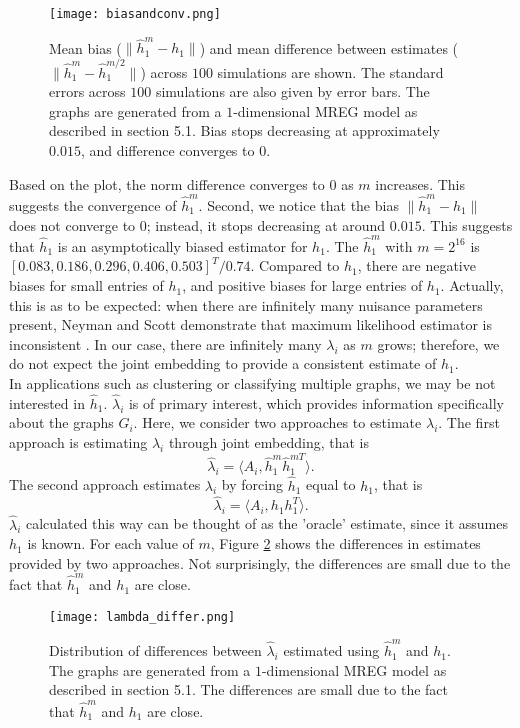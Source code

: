 \documentclass[10pt,journal,compsoc]{IEEEtran}
\begin{document}
\begin{figure}[!htbp]
	\centering
	\texttt{[image: biasandconv.png]}
	\caption{Mean bias ($\|\hat{h}^m_1-h_1\|$) and mean difference between estimates ($\|\hat{h}_1^m-\hat{h}_1^{m/2}\|$) across $100$ simulations are shown. The standard errors across $100$ simulations are also given by error bars. The graphs are generated from a $1$-dimensional MREG model as described in section 5.1. Bias stops decreasing at approximately $0.015$, and difference converges to $0$.}
	\label{fig:db}
\end{figure}

\noindent Based on the plot, the norm difference converges to $0$ as $m$ increases. This suggests the convergence of $\hat{h}_1^m$. Second, we notice that the bias $\|\hat{h}^m_1-h_1\|$ does not converge to $0$; instead, it stops decreasing at around $0.015$. This suggests that $\hat{h}_1$ is an asymptotically biased estimator for $h_1$. The $\hat{h}_1^m$ with $m=2^{16}$ is $[0.083,0.186, 0.296, 0.406, 0.503]^T/0.74$. Compared to $h_1$, there are negative biases for small entries of $h_1$, and positive biases for large entries of $h_1$. Actually, this is as to be expected: when there are infinitely many nuisance parameters present, Neyman and Scott demonstrate that maximum likelihood estimator is inconsistent \cite{neyman1948consistent}. In our case, there are infinitely many $\lambda_i$ as $m$ grows; therefore, we do not expect the joint embedding to provide a consistent estimate of $h_1$. \\

\noindent In applications such as clustering or classifying multiple graphs, we may be not interested in $\hat{h}_1$. $\hat{\lambda}_i$ is of primary interest, which provides information specifically about the graphs $G_i$. Here, we consider two approaches to estimate $\lambda_i$. The first approach is estimating $\lambda_i$ through joint embedding, that is
\[ \hat{\lambda}_i = \langle A_i,  \hat{h}^m_1 \hat{h}^{m T}_1 \rangle. \]
The second approach estimates $\lambda_i$ by forcing $\hat{h}_1$ equal to $h_1$, that is 
\[ \hat{\lambda}_i = \langle A_i,  h_1 h_1^T \rangle. \]
$\hat{\lambda}_i$ calculated this way can be thought of as the 'oracle' estimate, since it assumes $h_1$ is known. For each value of $m$, Figure \ref{fig:ld} shows the differences in estimates provided by two approaches. Not surprisingly, the differences are small due to the fact that $\hat{h}_1^m$ and $h_1$ are close.
\begin{figure}[!htbp]
	\centering
	\texttt{[image: lambda\_differ.png]}
	\caption{Distribution of differences between $\hat{\lambda}_i$ estimated using $\hat{h}_1^m$ and $h_1$. The graphs are generated from a $1$-dimensional MREG model as described in section 5.1. The differences are small due to the fact that $\hat{h}_1^m$ and $h_1$ are close.}
	\label{fig:ld}
\end{figure}
\end{document}
